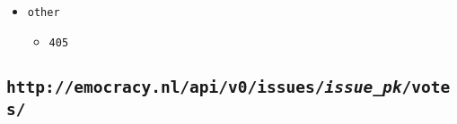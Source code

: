 \documentclass[a4paper]{report}
\begin{document}
\begin{itemize}
{\begin{itemize}
{\begin{itemize}
{\begin{itemize}
{                    URI of the tag resource is returned JSON encoded.}
                    \end{itemize}
                    }
                \end{itemize}
            }
            \item{\texttt{other}
                \begin{itemize}
                    \item{\texttt{405}}
                \end{itemize}
            }
        \end{itemize}
    }
\end{itemize}

\subsection{\texttt{http://emocracy.nl/api/v0/issues/\emph{issue\_pk}/votes/}}
\end{document}
